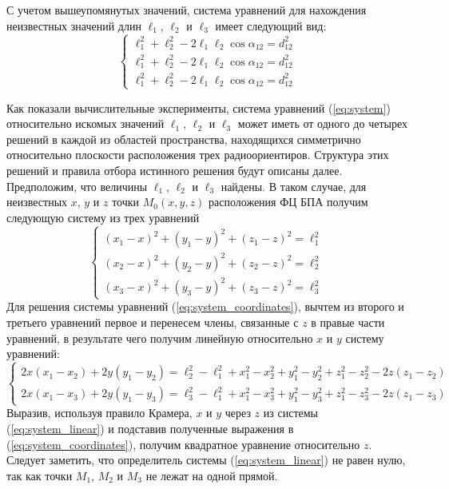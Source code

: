 \documentclass[../main.tex]{subfiles}
\begin{document}
С учетом вышеупомянутых значений, система уравнений для нахождения неизвестных значений длин $\ell_1$, $\ell_2$
и $\ell_3$ имеет следующий вид:
\begin{equation} \label{eq:system}
    \begin{cases}
    \ell_1^2 + \ell_2^2 - 2 \ell_1 \ell_2 \cos\alpha_{12} = d_{12}^2 \\
    \ell_1^2 + \ell_2^2 - 2 \ell_1 \ell_2 \cos\alpha_{12} = d_{12}^2 \\
    \ell_1^2 + \ell_2^2 - 2 \ell_1 \ell_2 \cos\alpha_{12} = d_{12}^2
    \end{cases}
\end{equation}

Как показали вычислительные эксперименты, система уравнений (\ref{eq:system}) относительно искомых значений
$\ell_1$, $\ell_2$ и $\ell_3$ может иметь от одного до четырех решений в каждой из областей пространства, находящихся
симметрично относительно плоскости расположения трех радиоориентиров. Структура этих решений и правила отбора
истинного решения будут описаны далее. Предположим, что величины $\ell_1$, $\ell_2$ и $\ell_3$ найдены. В таком
случае, для неизвестных $x$, $y$ и $z$ точки $M_0\left(x, y, z\right)$ расположения ФЦ БПА получим следующую
систему из трех уравнений
\begin{equation}\label{eq:system_coordinates}
    \begin{cases}
        \left(x_1 - x\right)^2 + \left(y_1 - y\right)^2 + \left(z_1 - z\right)^2 = \ell_1^2 \\
        \left(x_2 - x\right)^2 + \left(y_2 - y\right)^2 + \left(z_2 - z\right)^2 = \ell_2^2 \\
        \left(x_3 - x\right)^2 + \left(y_3 - y\right)^2 + \left(z_3 - z\right)^2 = \ell_3^2
    \end{cases}
\end{equation}
Для решения системы уравнений (\ref{eq:system_coordinates}), вычтем из второго и третьего уравнений первое и перенесем
члены, связанные с $z$ в правые части уравнений, в результате чего получим линейную относительно $x$ и $y$ систему уравнений:
\begin{equation}\label{eq:system_linear}
    \begin{cases}
        2x \left(x_1 - x_2\right) + 2 y \left(y_1 - y_2\right) =\ell_2^2 - \ell_1^2 + x_1^2 - x_2^2 + y_1^2 - y_2^2 + z_1^2 - z_2^2 - 2z\left(z_1 - z_2\right) \\
        2x \left(x_1 - x_3\right) + 2 y \left(y_1 - y_3\right) =\ell_3^2 - \ell_1^2 + x_1^2 - x_3^2 + y_1^2 - y_3^2 + z_1^2 - z_3^2 - 2z\left(z_1 - z_3\right)
    \end{cases}
\end{equation}
Выразив, используя правило Крамера, $x$ и $y$ через $z$ из системы (\ref{eq:system_linear}) и подставив полученные выражения в
(\ref{eq:system_coordinates}), получим квадратное уравнение относительно $z$. Следует заметить, что определитель системы
(\ref{eq:system_linear}) не равен нулю, так как точки $M_1$, $M_2$ и $M_3$ не лежат на одной прямой.
\end{document}

